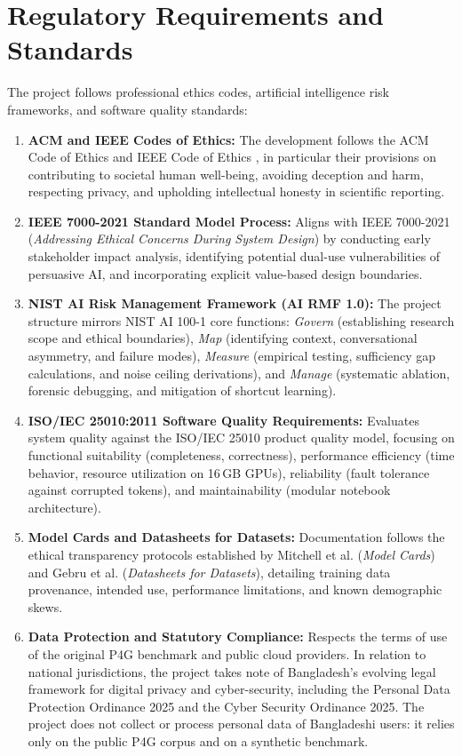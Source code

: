 \section{Regulatory Requirements and Standards}
\label{sec:standards}

The project follows professional ethics codes, artificial intelligence risk frameworks, and software quality standards:

\begin{enumerate}
  \item \textbf{ACM and IEEE Codes of Ethics:} The development follows the ACM Code of Ethics \cite{acmcode} and IEEE Code of Ethics \cite{ieeecode}, in particular their provisions on contributing to societal human well-being, avoiding deception and harm, respecting privacy, and upholding intellectual honesty in scientific reporting.
  \item \textbf{IEEE 7000-2021 Standard Model Process:} Aligns with IEEE 7000-2021 (\textit{Addressing Ethical Concerns During System Design}) \cite{ieee7000} by conducting early stakeholder impact analysis, identifying potential dual-use vulnerabilities of persuasive AI, and incorporating explicit value-based design boundaries.
  \item \textbf{NIST AI Risk Management Framework (AI RMF 1.0):} The project structure mirrors NIST AI 100-1 \cite{nistairmf} core functions: \textit{Govern} (establishing research scope and ethical boundaries), \textit{Map} (identifying context, conversational asymmetry, and failure modes), \textit{Measure} (empirical testing, sufficiency gap calculations, and noise ceiling derivations), and \textit{Manage} (systematic ablation, forensic debugging, and mitigation of shortcut learning).
  \item \textbf{ISO/IEC 25010:2011 Software Quality Requirements:} Evaluates system quality against the ISO/IEC 25010 \cite{iso25010} product quality model, focusing on functional suitability (completeness, correctness), performance efficiency (time behavior, resource utilization on 16\,GB GPUs), reliability (fault tolerance against corrupted tokens), and maintainability (modular notebook architecture).
  \item \textbf{Model Cards and Datasheets for Datasets:} Documentation follows the ethical transparency protocols established by Mitchell et al. \cite{mitchell2019model} (\textit{Model Cards}) and Gebru et al. \cite{gebru2021datasheets} (\textit{Datasheets for Datasets}), detailing training data provenance, intended use, performance limitations, and known demographic skews.
  \item \textbf{Data Protection and Statutory Compliance:} Respects the terms of use of the original P4G benchmark and public cloud providers. In relation to national jurisdictions, the project takes note of Bangladesh's evolving legal framework for digital privacy and cyber-security, including the Personal Data Protection Ordinance 2025 and the Cyber Security Ordinance 2025. The project does not collect or process personal data of Bangladeshi users: it relies only on the public P4G corpus and on a synthetic benchmark.
\end{enumerate}

